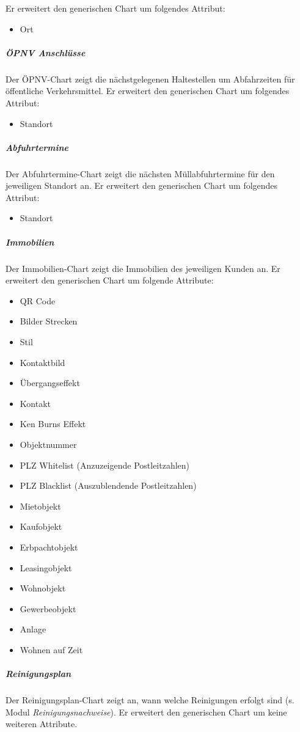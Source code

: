 \documentclass[a4paper]{article}
\begin{document}
	Er erweitert den generischen Chart um folgendes Attribut:
	\begin{itemize}
	\item Ort
	\end{itemize}
	\subparagraph{ÖPNV Anschlüsse}
	Der ÖPNV-Chart zeigt die nächstgelegenen Haltestellen um Abfahrzeiten für öffentliche Verkehrsmittel.
	Er erweitert den generischen Chart um folgendes Attribut:
	\begin{itemize}
	\item Standort
	\end{itemize}
	\subparagraph{Abfuhrtermine}
	Der Abfuhrtermine-Chart zeigt die nächsten Müllabfuhrtermine für den jeweiligen Standort an.
	Er erweitert den generischen Chart um folgendes Attribut:
	\begin{itemize}
	\item Standort
	\end{itemize}
	\subparagraph{Immobilien}
	Der Immobilien-Chart zeigt die Immobilien des jeweiligen Kunden an.
	Er erweitert den generischen Chart um folgende Attribute:
	\begin{itemize}
	\item QR Code
	\item Bilder Strecken
	\item Stil
	\item Kontaktbild
	\item Übergangseffekt
	\item Kontakt
	\item Ken Burns Effekt
	\item Objektnummer
	\item PLZ Whitelist (Anzuzeigende Postleitzahlen)
	\item PLZ Blacklist (Auszublendende Postleitzahlen)
	\item Mietobjekt
	\item Kaufobjekt
	\item Erbpachtobjekt
	\item Leasingobjekt
	\item Wohnobjekt
	\item Gewerbeobjekt
	\item Anlage
	\item Wohnen auf Zeit
	\end{itemize}
	\subparagraph{Reinigungsplan}
	Der Reinigungsplan-Chart zeigt an, wann welche Reinigungen erfolgt sind (s. Modul \emph{Reinigungsnachweise}).
	Er erweitert den generischen Chart um keine weiteren Attribute.
\end{document}
